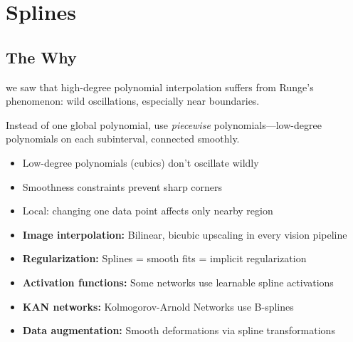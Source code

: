 \chapter{Splines}



\section{The Why}

 we saw that high-degree polynomial interpolation suffers from Runge's phenomenon: wild oscillations, especially near boundaries.

 Instead of one global polynomial, use \emph{piecewise} polynomials---low-degree polynomials on each subinterval, connected smoothly.

\begin{itemize}
    \item Low-degree polynomials (cubics) don't oscillate wildly
    \item Smoothness constraints prevent sharp corners
    \item Local: changing one data point affects only nearby region
\end{itemize}


\begin{itemize}
    \item \textbf{Image interpolation:} Bilinear, bicubic upscaling in every vision pipeline
    \item \textbf{Regularization:} Splines = smooth fits = implicit regularization
    \item \textbf{Activation functions:} Some networks use learnable spline activations
    \item \textbf{KAN networks:} Kolmogorov-Arnold Networks use B-splines
    \item \textbf{Data augmentation:} Smooth deformations via spline transformations
\end{itemize}

